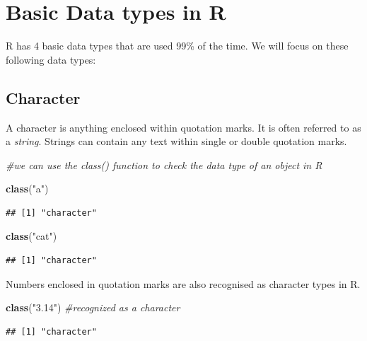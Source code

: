 \documentclass[
]{book}
\newenvironment{Shaded}{\begin{snugshade}}{\end{snugshade}}
\newcommand{\CommentTok}[1]{\textcolor[rgb]{0.56,0.35,0.01}{\textit{#1}}}
\newcommand{\FunctionTok}[1]{\textcolor[rgb]{0.13,0.29,0.53}{\textbf{#1}}}
\newcommand{\NormalTok}[1]{#1}
\newcommand{\StringTok}[1]{\textcolor[rgb]{0.31,0.60,0.02}{#1}}
\begin{document}
\section{Basic Data types in R}\label{basic-data-types-in-r}

R has 4 basic data types that are used 99\% of the time. We will focus on these following data types:

\subsection{Character}\label{character}

A character is anything enclosed within quotation marks. It is often referred to as a \emph{string}. Strings can contain any text within single or double quotation marks.

\begin{Shaded}
\begin{Highlighting}[]
\CommentTok{\#we can use the class() function to check the data type of an object in R}

\FunctionTok{class}\NormalTok{(}\StringTok{"a"}\NormalTok{)}
\end{Highlighting}
\end{Shaded}

\begin{verbatim}
## [1] "character"
\end{verbatim}

\begin{Shaded}
\begin{Highlighting}[]
\FunctionTok{class}\NormalTok{(}\StringTok{"cat"}\NormalTok{)}
\end{Highlighting}
\end{Shaded}

\begin{verbatim}
## [1] "character"
\end{verbatim}

Numbers enclosed in quotation marks are also recognised as character types in R.

\begin{Shaded}
\begin{Highlighting}[]
\FunctionTok{class}\NormalTok{(}\StringTok{"3.14"}\NormalTok{) }\CommentTok{\#recognized as a character}
\end{Highlighting}
\end{Shaded}

\begin{verbatim}
## [1] "character"
\end{verbatim}
\end{document}
